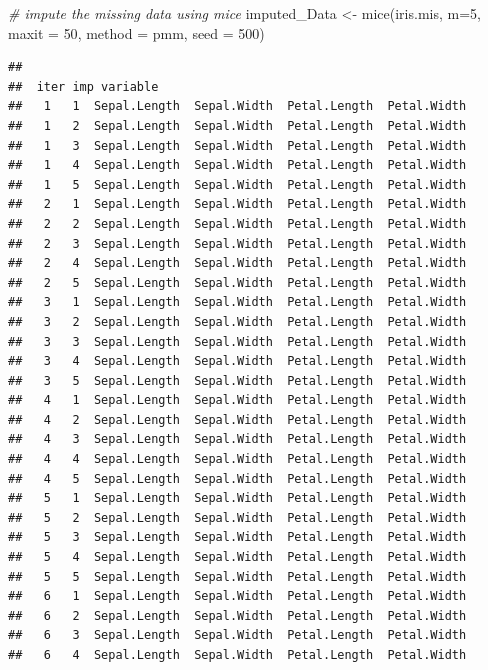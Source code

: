 \documentclass[
]{book}
\newenvironment{Shaded}{\begin{snugshade}}{\end{snugshade}}
\newcommand{\AttributeTok}[1]{\textcolor[rgb]{0.77,0.63,0.00}{#1}}
\newcommand{\CommentTok}[1]{\textcolor[rgb]{0.56,0.35,0.01}{\textit{#1}}}
\newcommand{\DecValTok}[1]{\textcolor[rgb]{0.00,0.00,0.81}{#1}}
\newcommand{\FunctionTok}[1]{\textcolor[rgb]{0.00,0.00,0.00}{#1}}
\newcommand{\NormalTok}[1]{#1}
\newcommand{\OtherTok}[1]{\textcolor[rgb]{0.56,0.35,0.01}{#1}}
\newcommand{\StringTok}[1]{\textcolor[rgb]{0.31,0.60,0.02}{#1}}
\begin{document}
\begin{Shaded}
\begin{Highlighting}[]
\CommentTok{\# impute the missing data using mice}
\NormalTok{imputed\_Data }\OtherTok{\textless{}{-}} \FunctionTok{mice}\NormalTok{(iris.mis, }\AttributeTok{m=}\DecValTok{5}\NormalTok{, }\AttributeTok{maxit =} \DecValTok{50}\NormalTok{, }\AttributeTok{method =} \StringTok{\textquotesingle{}pmm\textquotesingle{}}\NormalTok{, }\AttributeTok{seed =} \DecValTok{500}\NormalTok{)}
\end{Highlighting}
\end{Shaded}

\begin{verbatim}
## 
##  iter imp variable
##   1   1  Sepal.Length  Sepal.Width  Petal.Length  Petal.Width
##   1   2  Sepal.Length  Sepal.Width  Petal.Length  Petal.Width
##   1   3  Sepal.Length  Sepal.Width  Petal.Length  Petal.Width
##   1   4  Sepal.Length  Sepal.Width  Petal.Length  Petal.Width
##   1   5  Sepal.Length  Sepal.Width  Petal.Length  Petal.Width
##   2   1  Sepal.Length  Sepal.Width  Petal.Length  Petal.Width
##   2   2  Sepal.Length  Sepal.Width  Petal.Length  Petal.Width
##   2   3  Sepal.Length  Sepal.Width  Petal.Length  Petal.Width
##   2   4  Sepal.Length  Sepal.Width  Petal.Length  Petal.Width
##   2   5  Sepal.Length  Sepal.Width  Petal.Length  Petal.Width
##   3   1  Sepal.Length  Sepal.Width  Petal.Length  Petal.Width
##   3   2  Sepal.Length  Sepal.Width  Petal.Length  Petal.Width
##   3   3  Sepal.Length  Sepal.Width  Petal.Length  Petal.Width
##   3   4  Sepal.Length  Sepal.Width  Petal.Length  Petal.Width
##   3   5  Sepal.Length  Sepal.Width  Petal.Length  Petal.Width
##   4   1  Sepal.Length  Sepal.Width  Petal.Length  Petal.Width
##   4   2  Sepal.Length  Sepal.Width  Petal.Length  Petal.Width
##   4   3  Sepal.Length  Sepal.Width  Petal.Length  Petal.Width
##   4   4  Sepal.Length  Sepal.Width  Petal.Length  Petal.Width
##   4   5  Sepal.Length  Sepal.Width  Petal.Length  Petal.Width
##   5   1  Sepal.Length  Sepal.Width  Petal.Length  Petal.Width
##   5   2  Sepal.Length  Sepal.Width  Petal.Length  Petal.Width
##   5   3  Sepal.Length  Sepal.Width  Petal.Length  Petal.Width
##   5   4  Sepal.Length  Sepal.Width  Petal.Length  Petal.Width
##   5   5  Sepal.Length  Sepal.Width  Petal.Length  Petal.Width
##   6   1  Sepal.Length  Sepal.Width  Petal.Length  Petal.Width
##   6   2  Sepal.Length  Sepal.Width  Petal.Length  Petal.Width
##   6   3  Sepal.Length  Sepal.Width  Petal.Length  Petal.Width
##   6   4  Sepal.Length  Sepal.Width  Petal.Length  Petal.Width

\end{verbatim}
\end{document}
